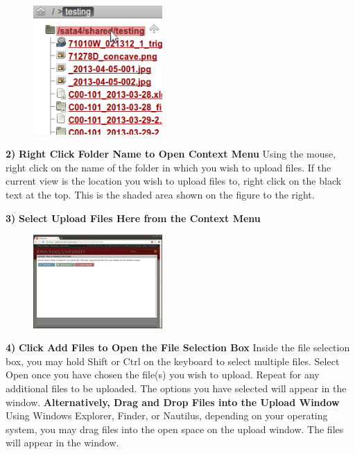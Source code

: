 \documentclass[10pt]{article}
\begin{document}
\begingroup
\setlength\intextsep{0pt}
\begin{figure}
		\includegraphics[width=1.9339in]{ContextMenu.png}
\end{figure}
\noindent\textbf{2)} \textbf{Right Click Folder Name to Open Context Menu} \newline Using the mouse, right click on the name of the folder in which you wish to upload files.  If the current view is the location you wish to upload files to, right click on the black text at the top.  This is the shaded area shown on the figure to the right.

\endgroup

\hfill \break
\hfill \break
\hfill \break
\hfill \break
\hfill \break
\hfill \break

\begin{changemargin}{0in}{150.4pt}
\noindent\textbf{3)} \textbf{Select Upload Files Here from the Context Menu}
\end{changemargin}

\begingroup
\setlength\intextsep{0pt}
\begin{figure}
		\includegraphics[width=1.9339in]{Upload.png}
\end{figure}
\noindent\textbf{4)} \textbf{Click Add Files to Open the File Selection Box} \newline Inside the file selection box, you may hold Shift or Ctrl on the keyboard to select multiple files.  Select Open once you have chosen the file(s) you wish to upload.  Repeat for any additional files to be uploaded.  The options you have selected will appear in the window. \newline\newline \textbf{Alternatively, Drag and Drop Files into the Upload Window} \newline Using Windows Explorer, Finder, or Nautilus, depending on your operating system, you may drag files into the open space on the upload window.  The files will appear in the window. 
\end{document}
